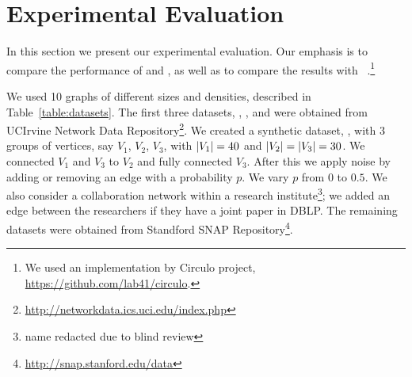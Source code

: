 \section{Experimental Evaluation}
\label{sec:exp}

In this section we present our experimental evaluation.  Our emphasis is to
compare the performance of \alggreedy and \algiterative, as well as to compare
the results with \algrolx~\cite{henderson2012rolx}.\footnote{We used an implementation by Circulo project, \url{https://github.com/lab41/circulo}.}


We used 10 graphs of different sizes and densities, described in Table~\ref{table:datasets}.
The first three datasets, \karate, \dolphins, and \lesmis were obtained from UCIrvine Network Data
Repository\footnote{\url{http://networkdata.ics.uci.edu/index.php}}.
We created a synthetic dataset, \synth, with 3 groups of vertices, say $V_1$,
$V_2$, $V_3$, with ${\left|V_1\right|} = 40$ and ${\left|V_2\right|} = {\left|V_3\right|} = 30$. We connected $V_1$ and $V_3$ to $V_2$ and fully connected $V_3$. After this
we apply noise by adding or removing an edge with a probability $p$. We vary $p$ from $0$ to $0.5$.
We also consider a collaboration network within a research
institute\footnote{name redacted due to blind review}; we added an edge
between the researchers if they have a joint paper in DBLP.
The
remaining datasets were obtained from Standford SNAP
Repository\footnote{\url{http://snap.stanford.edu/data}}.
\iffalse
\begin{itemize}
\item {\karate:} a social network of friendships between members of karate club at a US university in 1970.
\item {\dolphins:}  a social network of frequent associations between dolphins in a community living off Doubtful Sound in New Zealand.
\item {\lesmis:} co-appearance of characters in Les Miserables novel by Victor Hugo.
\item {\facebook:} friends list of Facebook users.
\item {\enron:} an e-mail communication network by Enron employees.
\item {\EUall:} an e-mail network from a EU research institution.
\item {\dblp:} a co-authorship network among computer science researchers.
\item {\youtube:} Youtube users network.
\end{itemize}
\fi

